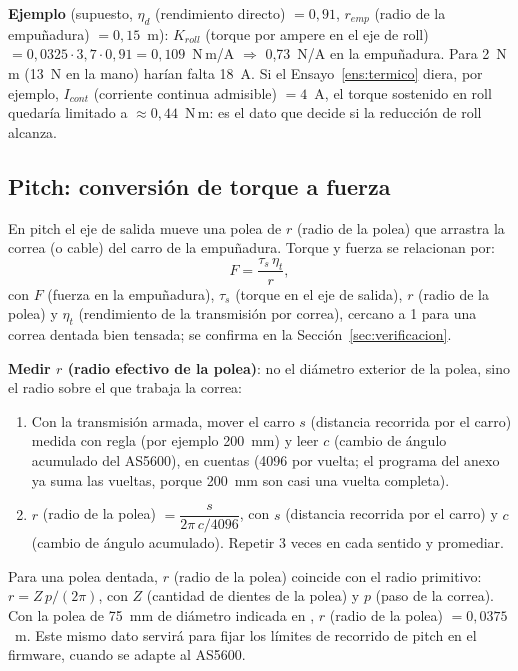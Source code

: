 \documentclass[11pt,a4paper]{article}
\newcommand{\code}[1]{\texttt{\detokenize{#1}}}
\begin{document}
\textbf{Ejemplo} (supuesto, $\eta_d$ (rendimiento directo) $= 0{,}91$, $r_{emp}$ (radio de la empuñadura) $= 0{,}15$~m): $K_{roll}$ (torque por ampere en el eje de roll) $= 0{,}0325\cdot3{,}7\cdot0{,}91 = 0{,}109$~N\,m/A $\Rightarrow$ 0,73~N/A en la empuñadura. Para 2~N\,m (13~N en la mano) harían falta 18~A. Si el Ensayo~\ref{ens:termico} diera, por ejemplo, $I_{cont}$ (corriente continua admisible) $= 4$~A, el torque sostenido en roll quedaría limitado a $\approx 0{,}44$~N\,m: es el dato que decide si la reducción de roll alcanza.

\subsection{Pitch: conversión de torque a fuerza}
\label{sec:pitch}

En pitch el eje de salida mueve una polea de $r$ (radio de la polea) que arrastra la correa (o cable) del carro de la empuñadura. Torque y fuerza se relacionan por:
\begin{equation}
F = \frac{\tau_s\,\eta_t}{r},
\end{equation}
con $F$ (fuerza en la empuñadura), $\tau_s$ (torque en el eje de salida), $r$ (radio de la polea) y $\eta_t$ (rendimiento de la transmisión por correa), cercano a 1 para una correa dentada bien tensada; se confirma en la Sección~\ref{sec:verificacion}.

\textbf{Medir $r$ (radio efectivo de la polea)}: no el diámetro exterior de la polea, sino el radio sobre el que trabaja la correa:
\begin{enumerate}
\item Con la transmisión armada, mover el carro $s$ (distancia recorrida por el carro) medida con regla (por ejemplo 200~mm) y leer $c$ (cambio de ángulo acumulado del AS5600), en cuentas (4096 por vuelta; el programa del anexo ya suma las vueltas, porque 200~mm son casi una vuelta completa).
\item $r$ (radio de la polea) $= \dfrac{s}{2\pi\,c/4096}$, con $s$ (distancia recorrida por el carro) y $c$ (cambio de ángulo acumulado). Repetir 3 veces en cada sentido y promediar.
\end{enumerate}
Para una polea dentada, $r$ (radio de la polea) coincide con el radio primitivo: $r = Z\,p/(2\pi)$, con $Z$ (cantidad de dientes de la polea) y $p$ (paso de la correa). Con la polea de 75~mm de diámetro indicada en \code{mis_defines.h}, $r$ (radio de la polea) $= 0{,}0375$~m. Este mismo dato servirá para fijar los límites de recorrido de pitch en el firmware, cuando se adapte al AS5600.
\end{document}
